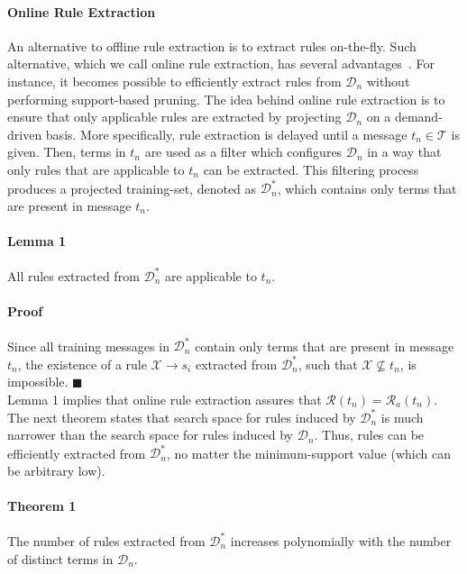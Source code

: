 \paragraph*{\bf{Online Rule Extraction}}
An alternative to offline rule extraction is to extract rules on-the-fly. Such alternative, which we call online rule extraction, has several advantages~\cite{sigir}. For instance, it becomes possible to efficiently extract rules from $\mathcal{D}_n$ without performing support-based pruning.
The idea behind online rule extraction is to ensure that only applicable rules are extracted by projecting $\mathcal{D}_n$ on a demand-driven basis. More specifically, rule extraction is delayed until a message $t_n\in\mathcal{T}$ is given. Then, terms in $t_n$ are used as a filter which configures $\mathcal{D}_n$ in a way that only rules that are applicable to $t_n$ can be extracted. This filtering process produces a projected training-set, denoted as $\mathcal{D}^{*}_n$, which contains only terms that are present in message $t_n$.

\paragraph*{\bf{Lemma 1}}
All rules extracted from $\mathcal{D}^{*}_n$ are applicable to $t_n$.

\paragraph*{\bf{Proof}}
Since all training messages in $\mathcal{D}^{*}_n$ contain only terms that are
present in message $t_n$, the existence of a rule
$\mathcal{X}\xrightarrow{}s_i$ extracted from $\mathcal{D}^{*}_n$, such that
$\mathcal{X}\nsubseteq t_n$, is impossible. $\blacksquare$\\

Lemma 1 implies that online rule extraction assures that $\mathcal{R}(t_n)=\mathcal{R}_a(t_n)$.
The next theorem states that
search space for rules induced by $\mathcal{D}^{*}_n$ is much narrower than the search space for rules induced by $\mathcal{D}_n$. Thus, rules
can be efficiently extracted from $\mathcal{D}^{*}_n$, no matter the minimum-support value (which can be arbitrary low).

\paragraph*{\bf{Theorem 1}}
The number of rules extracted from $\mathcal{D}^{*}_n$ increases polynomially with
the number of distinct terms in $\mathcal{D}_n$.

